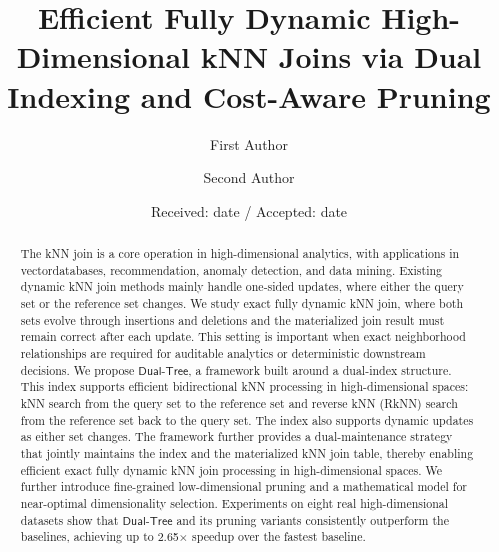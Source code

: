 \documentclass[twocolumn]{svjour3}
\newcommand{\kw}[1]{{\ensuremath{\mathsf{#1}}}\xspace}
\newcommand{\dualtree}{\kw{Dual}-\kw{Tree}}
\begin{document}
\title{Efficient Fully Dynamic High-Dimensional kNN Joins via Dual Indexing and Cost-Aware Pruning}

\author{First Author \and Second Author}

\date{Received: date / Accepted: date}

\maketitle

\begin{abstract}
The kNN join is a core operation in high-dimensional analytics, with applications in vector\linebreak databases, recommendation, anomaly detection, and data mining. Existing dynamic kNN join methods mainly handle one-sided updates, where either the query set or the reference set changes. We study exact fully dynamic kNN join, where both sets evolve through insertions and deletions and the materialized join result must remain correct after each update. This setting is important when exact neighborhood relationships are required for auditable analytics or deterministic downstream decisions. We propose \dualtree, a framework built around a dual-index structure. This index supports efficient bidirectional kNN processing in high-dimensional spaces: kNN search from the query set to the reference set and reverse kNN (RkNN) search from the reference set back to the query set. The index also supports dynamic updates as either set changes. The framework further provides a dual-maintenance strategy that jointly maintains the index and the materialized kNN join table, thereby enabling efficient exact fully dynamic kNN join processing in high-dimensional spaces. We further introduce fine-grained low-dimensional pruning and a mathematical model for near-optimal dimensionality selection. Experiments on eight real high-dimensional datasets show that \dualtree and its pruning variants consistently outperform the baselines, achieving up to 2.65$\times$ speedup over the fastest baseline.
\end{abstract}
\end{document}
